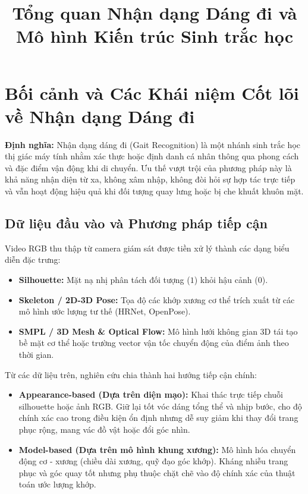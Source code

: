 \documentclass[11pt, a4paper]{article}
\title{\textbf{Tổng quan Nhận dạng Dáng đi và Mô hình Kiến trúc Sinh trắc học}}
\author{}
\date{}
\begin{document}
\maketitle
\vspace{-1.2cm}

\section{Bối cảnh và Các Khái niệm Cốt lõi về Nhận dạng Dáng đi}

\textbf{Định nghĩa:} Nhận dạng dáng đi (Gait Recognition) là một nhánh sinh trắc học thị giác máy tính nhằm xác thực hoặc định danh cá nhân thông qua phong cách và đặc điểm vận động khi di chuyển. Ưu thế vượt trội của phương pháp này là khả năng nhận diện từ xa, không xâm nhập, không đòi hỏi sự hợp tác trực tiếp và vẫn hoạt động hiệu quả khi đối tượng quay lưng hoặc bị che khuất khuôn mặt.

\subsection{Dữ liệu đầu vào và Phương pháp tiếp cận}
Video RGB thu thập từ camera giám sát được tiền xử lý thành các dạng biểu diễn đặc trưng:
\begin{itemize}
    \item \textbf{Silhouette:} Mặt nạ nhị phân tách đối tượng ($1$) khỏi hậu cảnh ($0$).
    \item \textbf{Skeleton / 2D-3D Pose:} Tọa độ các khớp xương cơ thể trích xuất từ các mô hình ước lượng tư thế (HRNet, OpenPose).
    \item \textbf{SMPL / 3D Mesh \& Optical Flow:} Mô hình lưới không gian 3D tái tạo bề mặt cơ thể hoặc trường vector vận tốc chuyển động của điểm ảnh theo thời gian.
\end{itemize}

Từ các dữ liệu trên, nghiên cứu chia thành hai hướng tiếp cận chính:
\begin{itemize}
    \item \textbf{Appearance-based (Dựa trên diện mạo):} Khai thác trực tiếp chuỗi silhouette hoặc ảnh RGB. Giữ lại tốt vóc dáng tổng thể và nhịp bước, cho độ chính xác cao trong điều kiện ổn định nhưng dễ suy giảm khi thay đổi trang phục rộng, mang vác đồ vật hoặc đổi góc nhìn.
    \item \textbf{Model-based (Dựa trên mô hình khung xương):} Mô hình hóa chuyển động cơ - xương (chiều dài xương, quỹ đạo góc khớp). Kháng nhiễu trang phục và góc quay tốt nhưng phụ thuộc chặt chẽ vào độ chính xác của thuật toán ước lượng khớp.
\end{itemize}
\end{document}
